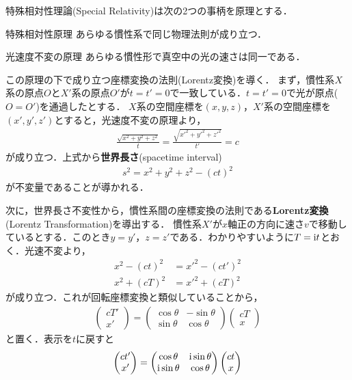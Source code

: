 \documentclass{report}
\begin{document}
  特殊相対性理論(Special Relativity)は次の2つの事柄を原理とする．
  \begin{itembox}[l]{特殊相対性原理}
    あらゆる慣性系で同じ物理法則が成り立つ．
  \end{itembox}
  \begin{itembox}[l]{光速度不変の原理}
    あらゆる慣性形で真空中の光の速さは同一である．
  \end{itembox}
  この原理の下で成り立つ座標変換の法則(Lorentz変換)を導く．
  まず，慣性系$X$系の原点$O$と$X'$系の原点$O'$が$t=t'=0$で一致している．$t=t'=0$で光が原点($O=O'$)を通過したとする．
  $X$系の空間座標を$(x,y,z)$，$X'$系の空間座標を$(x',y',z')$とすると，光速度不変の原理より，
  \begin{align}
    \frac{\sqrt{x^2 + y^2 + z^2}}{t} = \frac{\sqrt{x'^2 + y'^2 + z'^2}}{t'} = c
  \end{align}
  が成り立つ．上式から\textbf{世界長さ}(spacetime interval)
  \begin{align}
    s^2 = x^2 + y^2 + z^2 - (ct)^2
  \end{align}
  が不変量であることが導かれる．
  \par
  次に，世界長さ不変性から，慣性系間の座標変換の法則である\textbf{Lorentz変換}(Lorentz Transformation)を導出する．
  慣性系$X'$が$x$軸正の方向に速さ$v$で移動しているとする．このとき$y=y'，z=z'$である．わかりやすいように$T=\mathrm{i} t$とおく．光速不変より，
  \begin{align}
    x^2 - (ct)^2 &= x'^2 - (ct')^2\\
    x^2 + (cT)^2 &= x'^2 + (cT)^2
  \end{align}
  が成り立つ．これが回転座標変換と類似していることから，
  \begin{align}
    \begin{pmatrix}
      cT' \\ x'
    \end{pmatrix}
    =
    \begin{pmatrix}
      \cos\theta & -\sin\theta\\
      \sin\theta & \cos\theta
    \end{pmatrix}
    \begin{pmatrix}
      cT\\x
    \end{pmatrix}
  \end{align}
  と置く．表示を$t$に戻すと
  \begin{align}
    \begin{pmatrix}
      ct' \\ x'
    \end{pmatrix}
    =
    \begin{pmatrix}
      \cos\theta & \mathrm{i}\sin\theta\\
      \mathrm{i}\sin\theta & \cos\theta
    \end{pmatrix}
    \begin{pmatrix}
      ct\\x
    \end{pmatrix}
  \end{align}
\end{document}

